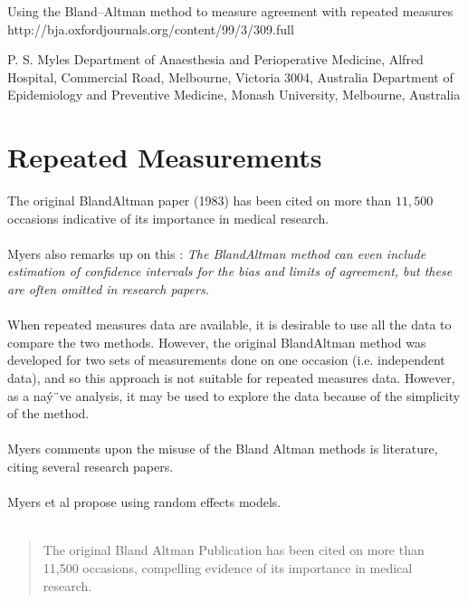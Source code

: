 Using the Bland–Altman method to measure agreement with repeated measures
http://bja.oxfordjournals.org/content/99/3/309.full

P. S. Myles
Department of Anaesthesia and Perioperative Medicine, Alfred Hospital, Commercial Road, Melbourne, Victoria 3004, Australia
Department of Epidemiology and Preventive Medicine, Monash University, Melbourne, Australia



\section{Repeated Measurements}
The original BlandAltman paper (1983) has been cited on more than
$11,500$ occasions indicative of its importance in medical
research.
\\
\\
Myers also remarks up on this : \emph{The BlandAltman method can
even include estimation of confidence intervals for the bias and
limits of agreement, but these are often omitted in research
papers.}
\\
\\
When repeated measures data are available, it is desirable to use
all the data to compare the two methods. However, the original
BlandAltman method was developed for two sets of measurements
done on one occasion (i.e. independent data), and so this approach
is not suitable for repeated measures data. However, as a naý¨ve
analysis, it may be used to explore the data because of the
simplicity of the method.
\\
\\
Myers comments upon the misuse of the Bland Altman methods is
literature, citing several research papers.
\\
\\
Myers et al propose using random effects models.
\\
\\



\begin{quote}
The original Bland Altman Publication has been cited on more than 11,500 occasions, compelling evidence of its 
importance in medical research.
\end{quote}

